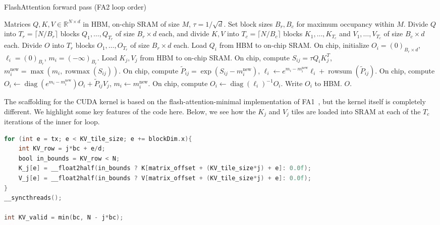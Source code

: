 \documentclass[12pt]{article}
\begin{document}
\begin{algorithm}[H]
\caption{FlashAttention forward pass (FA2 loop order)}
\label{alg:fa}
\begin{algorithmic}[1]
\Require Matrices $Q, K, V \in \mathbb{R}^{N \times d}$ in HBM, on-chip SRAM of size $M$, $\tau = 1/\sqrt{d}$.
\State Set block sizes $B_r, B_c$ for maximum occupancy within $M$.
\State Divide $Q$ into $T_r = \lceil N/B_r \rceil$ blocks $Q_1, \dots, Q_{T_r}$ of size $B_r \times d$ each, and divide $K, V$ into $T_c = \lceil N/B_c \rceil$ blocks $K_1, \dots, K_{T_c}$ and $V_1, \dots, V_{T_c}$ of size $B_c \times d$ each.
\State Divide $O$ into $T_r$ blocks $O_1, \dots, O_{T_r}$ of size $B_r \times d$ each.
    \State Load $Q_i$ from HBM to on-chip SRAM.
    \State On chip, initialize $O_i = (0)_{B_r \times d}$, $\ell_i = (0)_{B_r}$, $m_i = (-\infty)_{B_r}$.
        \State Load $K_j, V_j$ from HBM to on-chip SRAM.
        \State On chip, compute $S_{ij} = \tau Q_i K_j^T$, $m_i^{\text{new}} = \max(m_i, \operatorname{rowmax}(S_{ij}))$.
        \State On chip, compute $\tilde{P}_{ij} = \exp(S_{ij} - m_i^{\text{new}})$, $\ell_i \gets e^{m_i - m_i^{\text{new}}} \ell_i + \operatorname{rowsum}(\tilde{P}_{ij})$.
        \State On chip, compute $O_i \gets \operatorname{diag}(e^{m_i - m_i^{\text{new}}}) O_i + \tilde{P}_{ij} V_j$, $m_i \gets m_i^{\text{new}}$.
    \EndFor
    \State On chip, compute $O_i \gets \operatorname{diag}(\ell_i)^{-1} O_i$.
    \State Write $O_i$ to HBM.
\EndFor
\State \Return $O$.
\end{algorithmic}
\end{algorithm}

The scaffolding for the CUDA kernel is based on the flash-attention-minimal implementation of FA1~\cite{kim2024flashattentionminimal}, but the kernel itself is completely different. We highlight some key features of the code here. Below, we see how the $K_j$ and $V_j$ tiles are loaded into SRAM at each of the $T_c$ iterations of the inner for loop.


\begin{lstlisting}[language=C, caption={Loading $K_j$ and $V_j$ into shared memory.}]
for (int e = tx; e < KV_tile_size; e += blockDim.x){
	int KV_row = j*bc + e/d;
	bool in_bounds = KV_row < N;
	K_j[e] = __float2half(in_bounds ? K[matrix_offset + (KV_tile_size*j) + e]: 0.0f);
	V_j[e] = __float2half(in_bounds ? V[matrix_offset + (KV_tile_size*j) + e]: 0.0f);
}
__syncthreads();

int KV_valid = min(bc, N - j*bc);
\end{lstlisting}
\end{document}
